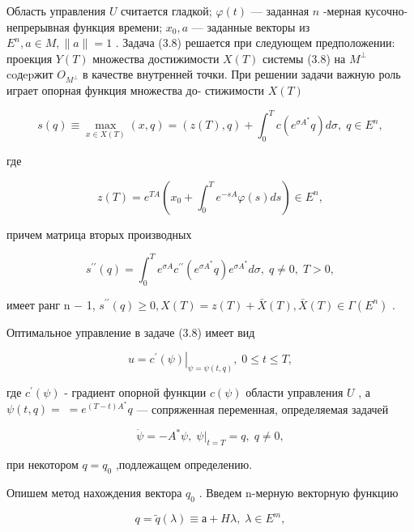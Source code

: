 \documentclass[10pt]{article}
\begin{document}
Область управления \(U\) считается гладкой; \(\varphi \left( t\right)\) — заданная \(n\) -мерная кусочно- непрерывная функция времени; \({x}_{0},a\) — заданные векторы из \({E}^{n},a \in  M,\parallel a\parallel  = 1\) . Задача (3.8) решается при следующем предположении: проекция \(Y\left( T\right)\) множества достижимости \(X\left( T\right)\) системы (3.8) на \({M}^{ \bot  }\) coдepжит \({O}_{{M}^{ \bot  }}\) в качестве внутренней точки. При решении задачи важную роль играет опорная функция множества до- стижимости \(X\left( T\right)\)

\[
s\left( q\right)  \equiv  \mathop{\max }\limits_{{x \in  X\left( T\right) }}\left( {x,q}\right)  = \left( {z\left( T\right) ,q}\right)  + {\int }_{0}^{T}c\left( {{e}^{\sigma {A}^{ * }}q}\right) {d\sigma },\;q \in  {E}^{n},
\]

где

\[
z\left( T\right)  = {e}^{TA}\left( {{x}_{0} + {\int }_{0}^{T}{e}^{-{sA}}\varphi \left( s\right) {ds}}\right)  \in  {E}^{n},
\]

причем матрица вторых производных

\[
{s}^{\prime \prime }\left( q\right)  = {\int }_{0}^{T}{e}^{\sigma A}{c}^{\prime \prime }\left( {{e}^{\sigma {A}^{ * }}q}\right) {e}^{\sigma {A}^{ * }}{d\sigma },\;q \neq  0,\;T > 0,
\]

имеет ранг n − 1, \({s}^{\prime \prime }\left( q\right)  \geq  0,X\left( T\right)  = z\left( T\right)  + \bar{X}\left( T\right) ,\bar{X}\left( T\right)  \in  \Gamma \left( {E}^{n}\right)\) .

Оптимальное управление в задаче (3.8) имеет вид

\[
{\left. u = {c}^{\prime }\left( \psi \right) \right| }_{\psi  = \psi \left( {t,q}\right) },\;0 \leq  t \leq  T, \tag{3.9}
\]

где \({c}^{\prime }\left( \psi \right)\) - градиент опорной функции \(c\left( \psi \right)\) области управления \(U\) , а \(\psi \left( {t,q}\right)  = \; = {e}^{\left( {T - t}\right) {A}^{ * }}q\) — сопряженная переменная, определяемая задачей

\[
\dot{\psi } =  - {A}^{ * }\psi ,{\left. \;\psi \right| }_{t = T} = q,\;q \neq  0,
\]

при некотором \(q = {q}_{0}\) ,подлежащем определению.

Опишем метод нахождения вектора \({q}_{0}\) . Введем n-мерную векторную функцию

\[
q = \widetilde{q}\left( \lambda \right)  \equiv  а + {H\lambda },\;\lambda  \in  {E}^{m},
\]
\end{document}
